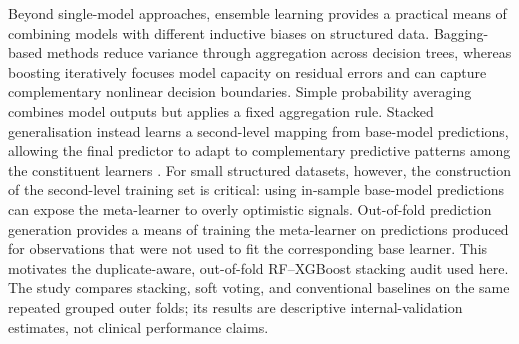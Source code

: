 \documentclass[a4paper,fleqn]{cas-dc}
\begin{document}
Beyond single-model approaches, ensemble learning provides a practical means of combining models with different inductive biases on structured data. Bagging-based methods reduce variance through aggregation across decision trees, whereas boosting iteratively focuses model capacity on residual errors and can capture complementary nonlinear decision boundaries. Simple probability averaging combines model outputs but applies a fixed aggregation rule. Stacked generalisation instead learns a second-level mapping from base-model predictions, allowing the final predictor to adapt to complementary predictive patterns among the constituent learners \cite{wolpert1992}. For small structured datasets, however, the construction of the second-level training set is critical: using in-sample base-model predictions can expose the meta-learner to overly optimistic signals. Out-of-fold prediction generation provides a means of training the meta-learner on predictions produced for observations that were not used to fit the corresponding base learner. This motivates the duplicate-aware, out-of-fold RF--XGBoost stacking audit used here. The study compares stacking, soft voting, and conventional baselines on the same repeated grouped outer folds; its results are descriptive internal-validation estimates, not clinical performance claims.
\end{document}

